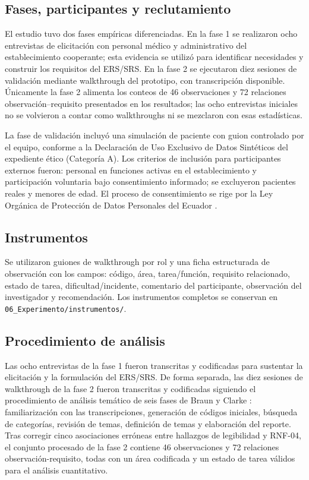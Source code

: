\documentclass[runningheads]{llncs}
\begin{document}
	\subsection{Fases, participantes y reclutamiento}
	El estudio tuvo dos fases empíricas diferenciadas. En la fase 1 se realizaron ocho entrevistas de elicitación con personal médico y administrativo del establecimiento cooperante; esta evidencia se utilizó para identificar necesidades y construir los requisitos del ERS/SRS. En la fase 2 se ejecutaron diez sesiones de validación mediante walkthrough del prototipo, con transcripción disponible. Únicamente la fase 2 alimenta los conteos de 46 observaciones y 72 relaciones observación--requisito presentados en los resultados; las ocho entrevistas iniciales no se volvieron a contar como walkthroughs ni se mezclaron con esas estadísticas.
	
	La fase de validación incluyó una simulación de paciente con guion controlado por el equipo, conforme a la Declaración de Uso Exclusivo de Datos Sintéticos del expediente ético (Categoría A). Los criterios de inclusión para participantes externos fueron: personal en funciones activas en el establecimiento y participación voluntaria bajo consentimiento informado; se excluyeron pacientes reales y menores de edad. El proceso de consentimiento se rige por la Ley Orgánica de Protección de Datos Personales del Ecuador \cite{loppd}.
	
	\subsection{Instrumentos}
	Se utilizaron guiones de walkthrough por rol y una ficha estructurada de observación con los campos: código, área, tarea/función, requisito relacionado, estado de tarea, dificultad/incidente, comentario del participante, observación del investigador y recomendación. Los instrumentos completos se conservan en \texttt{06\_Experimento/instrumentos/}.
	
	\subsection{Procedimiento de análisis}\label{sec:procedimiento-analisis}
	Las ocho entrevistas de la fase 1 fueron transcritas y codificadas para sustentar la elicitación y la formulación del ERS/SRS. De forma separada, las diez sesiones de walkthrough de la fase 2 fueron transcritas y codificadas siguiendo el procedimiento de análisis temático de seis fases de Braun y Clarke \cite{braunclarke2006}: familiarización con las transcripciones, generación de códigos iniciales, búsqueda de categorías, revisión de temas, definición de temas y elaboración del reporte. Tras corregir cinco asociaciones erróneas entre hallazgos de legibilidad y RNF-04, el conjunto procesado de la fase 2 contiene 46 observaciones y 72 relaciones observación-requisito, todas con un área codificada y un estado de tarea válidos para el análisis cuantitativo.
	
\end{document}
